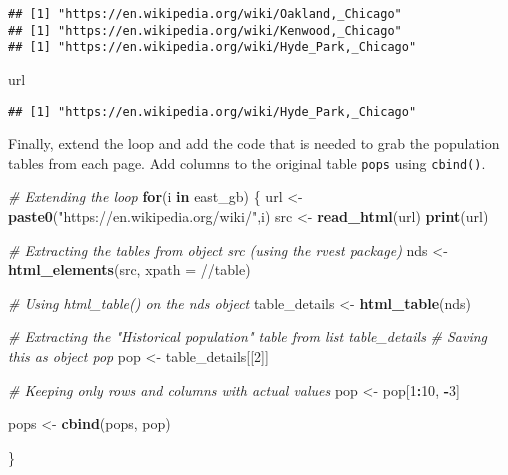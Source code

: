 \documentclass[
]{article}
\newenvironment{Shaded}{\begin{snugshade}}{\end{snugshade}}
\newcommand{\AttributeTok}[1]{\textcolor[rgb]{0.13,0.29,0.53}{#1}}
\newcommand{\CommentTok}[1]{\textcolor[rgb]{0.56,0.35,0.01}{\textit{#1}}}
\newcommand{\ControlFlowTok}[1]{\textcolor[rgb]{0.13,0.29,0.53}{\textbf{#1}}}
\newcommand{\DecValTok}[1]{\textcolor[rgb]{0.00,0.00,0.81}{#1}}
\newcommand{\FunctionTok}[1]{\textcolor[rgb]{0.13,0.29,0.53}{\textbf{#1}}}
\newcommand{\NormalTok}[1]{#1}
\newcommand{\OtherTok}[1]{\textcolor[rgb]{0.56,0.35,0.01}{#1}}
\newcommand{\SpecialCharTok}[1]{\textcolor[rgb]{0.81,0.36,0.00}{\textbf{#1}}}
\newcommand{\StringTok}[1]{\textcolor[rgb]{0.31,0.60,0.02}{#1}}
\begin{document}
\begin{verbatim}
## [1] "https://en.wikipedia.org/wiki/Oakland,_Chicago"
## [1] "https://en.wikipedia.org/wiki/Kenwood,_Chicago"
## [1] "https://en.wikipedia.org/wiki/Hyde_Park,_Chicago"
\end{verbatim}

\begin{Shaded}
\begin{Highlighting}[]
\NormalTok{url}
\end{Highlighting}
\end{Shaded}

\begin{verbatim}
## [1] "https://en.wikipedia.org/wiki/Hyde_Park,_Chicago"
\end{verbatim}

Finally, extend the loop and add the code that is needed to grab the
population tables from each page. Add columns to the original table
\texttt{pops} using \texttt{cbind()}.

\begin{Shaded}
\begin{Highlighting}[]
\CommentTok{\# Extending the loop}
\ControlFlowTok{for}\NormalTok{(i }\ControlFlowTok{in}\NormalTok{ east\_gb) \{}
\NormalTok{   url }\OtherTok{\textless{}{-}} \FunctionTok{paste0}\NormalTok{(}\StringTok{"https://en.wikipedia.org/wiki/"}\NormalTok{,i)}
\NormalTok{   src }\OtherTok{\textless{}{-}} \FunctionTok{read\_html}\NormalTok{(url)}
  \FunctionTok{print}\NormalTok{(url)   }

\CommentTok{\# Extracting the tables from object src (using the \textasciigrave{}rvest\textasciigrave{} package) }
\NormalTok{    nds }\OtherTok{\textless{}{-}} \FunctionTok{html\_elements}\NormalTok{(src, }\AttributeTok{xpath =} \StringTok{\textquotesingle{}//table\textquotesingle{}}\NormalTok{)}
  
\CommentTok{\# Using html\_table() on the nds object  }
\NormalTok{    table\_details }\OtherTok{\textless{}{-}} \FunctionTok{html\_table}\NormalTok{(nds)}

\CommentTok{\# Extracting the "Historical population" table from list table\_details }
\CommentTok{\# Saving this as object pop}
\NormalTok{  pop }\OtherTok{\textless{}{-}}\NormalTok{ table\_details[[}\DecValTok{2}\NormalTok{]]}

\CommentTok{\# Keeping only rows and columns with actual values}
\NormalTok{  pop }\OtherTok{\textless{}{-}}\NormalTok{ pop[}\DecValTok{1}\SpecialCharTok{:}\DecValTok{10}\NormalTok{, }\SpecialCharTok{{-}}\DecValTok{3}\NormalTok{]}

\NormalTok{pops }\OtherTok{\textless{}{-}} \FunctionTok{cbind}\NormalTok{(pops, pop)}
  
\NormalTok{\}}
\end{Highlighting}
\end{Shaded}
\end{document}
